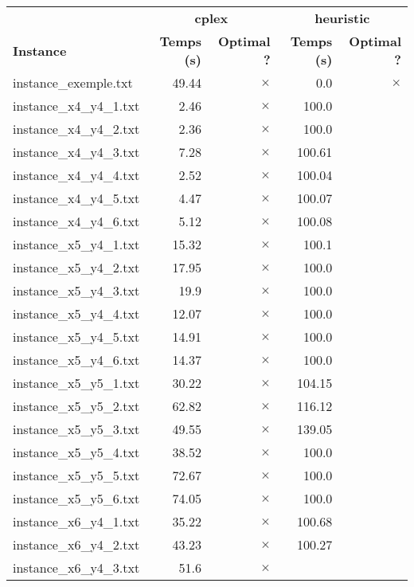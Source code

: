 \documentclass{article}
\begin{document}
\begin{center}
\renewcommand{\arraystretch}{1.4} 
 \begin{tabular}{lrrrr}
	\hline
 & \multicolumn{2}{c}{\textbf{cplex}} & \multicolumn{2}{c}{\textbf{heuristic}}\\
\textbf{Instance}  & \textbf{Temps (s)} & \textbf{Optimal ?}  & \textbf{Temps (s)} & \textbf{Optimal ?} \\\hline

instance\_exemple.txt & 49.44 & 
$\times$
 & 0.0 & 
$\times$
\\
instance\_x4\_y4\_1.txt & 2.46 & 
$\times$
 & 100.0 & 
\\
instance\_x4\_y4\_2.txt & 2.36 & 
$\times$
 & 100.0 & 
\\
instance\_x4\_y4\_3.txt & 7.28 & 
$\times$
 & 100.61 & 
\\
instance\_x4\_y4\_4.txt & 2.52 & 
$\times$
 & 100.04 & 
\\
instance\_x4\_y4\_5.txt & 4.47 & 
$\times$
 & 100.07 & 
\\
instance\_x4\_y4\_6.txt & 5.12 & 
$\times$
 & 100.08 & 
\\
instance\_x5\_y4\_1.txt & 15.32 & 
$\times$
 & 100.1 & 
\\
instance\_x5\_y4\_2.txt & 17.95 & 
$\times$
 & 100.0 & 
\\
instance\_x5\_y4\_3.txt & 19.9 & 
$\times$
 & 100.0 & 
\\
instance\_x5\_y4\_4.txt & 12.07 & 
$\times$
 & 100.0 & 
\\
instance\_x5\_y4\_5.txt & 14.91 & 
$\times$
 & 100.0 & 
\\
instance\_x5\_y4\_6.txt & 14.37 & 
$\times$
 & 100.0 & 
\\
instance\_x5\_y5\_1.txt & 30.22 & 
$\times$
 & 104.15 & 
\\
instance\_x5\_y5\_2.txt & 62.82 & 
$\times$
 & 116.12 & 
\\
instance\_x5\_y5\_3.txt & 49.55 & 
$\times$
 & 139.05 & 
\\
instance\_x5\_y5\_4.txt & 38.52 & 
$\times$
 & 100.0 & 
\\
instance\_x5\_y5\_5.txt & 72.67 & 
$\times$
 & 100.0 & 
\\
instance\_x5\_y5\_6.txt & 74.05 & 
$\times$
 & 100.0 & 
\\
instance\_x6\_y4\_1.txt & 35.22 & 
$\times$
 & 100.68 & 
\\
instance\_x6\_y4\_2.txt & 43.23 & 
$\times$
 & 100.27 & 
\\
instance\_x6\_y4\_3.txt & 51.6 & 
$\times$

\end{tabular}
\end{center}
\end{document}

